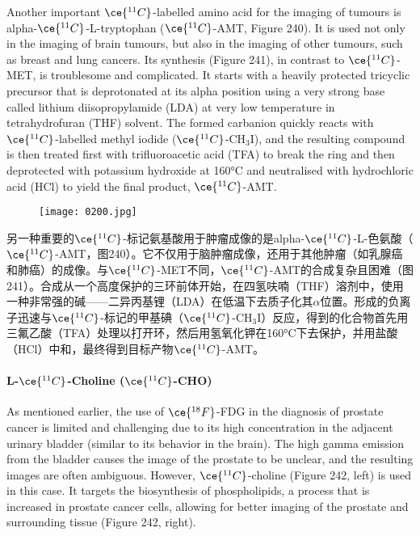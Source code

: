 \documentclass[dvipsnames, svgnames,a4paper,11pt]{article}
\begin{document}
Another important \(\ce{^{11}C}\)-labelled amino acid for the imaging of tumours is alpha-\(\ce{^{11}C}\)-L-tryptophan (\(\ce{^{11}C}\)-AMT, Figure 240). It is used not only in the imaging of brain tumours, but also in the imaging of other tumours, such as breast and lung cancers. Its synthesis (Figure 241), in contrast to \(\ce{^{11}C}\)-MET, is troublesome and complicated. It starts with a heavily protected tricyclic precursor that is deprotonated at its alpha position using a very strong base called lithium diisopropylamide (LDA) at very low temperature in tetrahydrofuran (THF) solvent. The formed carbanion quickly reacts with \(\ce{^{11}C}\)-labelled methyl iodide (\(\ce{^{11}C}\)-CH\(_3\)I), and the resulting compound is then treated first with trifluoroacetic acid (TFA) to break the ring and then deprotected with potassium hydroxide at 160°C and neutralised with hydrochloric acid (HCl) to yield the final product, \(\ce{^{11}C}\)-AMT.

\begin{figure}[h]
	\centering
    \texttt{[image: 0200.jpg]}  
     \label{fig241}
\end{figure}


另一种重要的\(\ce{^{11}C}\)-标记氨基酸用于肿瘤成像的是alpha-\(\ce{^{11}C}\)-L-色氨酸（\(\ce{^{11}C}\)-AMT，图240）。它不仅用于脑肿瘤成像，还用于其他肿瘤（如乳腺癌和肺癌）的成像。与\(\ce{^{11}C}\)-MET不同，\(\ce{^{11}C}\)-AMT的合成复杂且困难（图241）。合成从一个高度保护的三环前体开始，在四氢呋喃（THF）溶剂中，使用一种非常强的碱——二异丙基锂（LDA）在低温下去质子化其$\alpha$位置。形成的负离子迅速与\(\ce{^{11}C}\)-标记的甲基碘（\(\ce{^{11}C}\)-CH\(_3\)I）反应，得到的化合物首先用三氟乙酸（TFA）处理以打开环，然后用氢氧化钾在160°C下去保护，并用盐酸（HCl）中和，最终得到目标产物\(\ce{^{11}C}\)-AMT。


\paragraph{L-\(\ce{^{11}C}\)-Choline (\(\ce{^{11}C}\)-CHO) }  


As mentioned earlier, the use of \(\ce{^{18}F}\)-FDG in the diagnosis of prostate cancer is limited and challenging due to its high concentration in the adjacent urinary bladder (similar to its behavior in the brain). The high gamma emission from the bladder causes the image of the prostate to be unclear, and the resulting images are often ambiguous. However, \(\ce{^{11}C}\)-choline (Figure 242, left) is used in this case. It targets the biosynthesis of phospholipids, a process that is increased in prostate cancer cells, allowing for better imaging of the prostate and surrounding tissue (Figure 242, right).
\end{document}
